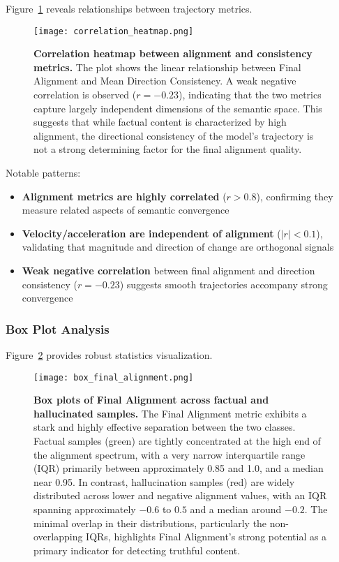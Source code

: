 \documentclass[11pt]{article}
\begin{document}
Figure~\ref{fig:correlation} reveals relationships between trajectory metrics.

\begin{figure}[h]
\centering
\texttt{[image: correlation\_heatmap.png]}
\caption{\textbf{Correlation heatmap between alignment and consistency metrics.}
The plot shows the linear relationship between Final Alignment and Mean Direction Consistency.
A weak negative correlation is observed ($r = -0.23$), indicating that the two metrics capture largely independent dimensions of the semantic space.
This suggests that while factual content is characterized by high alignment, the directional consistency of the model's trajectory is not a strong determining factor for the final alignment quality.}

\label{fig:correlation}
\end{figure}

Notable patterns:
\begin{itemize}[leftmargin=*]
    \item \textbf{Alignment metrics are highly correlated} ($r > 0.8$), confirming they measure related aspects of semantic convergence
    \item \textbf{Velocity/acceleration are independent of alignment} ($|r| < 0.1$), validating that magnitude and direction of change are orthogonal signals
    \item \textbf{Weak negative correlation} between final alignment and direction consistency ($r = -0.23$) suggests smooth trajectories accompany strong convergence
\end{itemize}

\subsubsection{Box Plot Analysis}

Figure~\ref{fig:boxplot_analysis} provides robust statistics visualization.

\begin{figure}[h]
\centering
\texttt{[image: box\_final\_alignment.png]}
\caption{\textbf{Box plots of Final Alignment across factual and hallucinated samples.}
The Final Alignment metric exhibits a stark and highly effective separation between the two classes.
Factual samples (green) are tightly concentrated at the high end of the alignment spectrum, with a very narrow interquartile range (IQR) primarily between approximately 0.85 and 1.0, and a median near 0.95.
In contrast, hallucination samples (red) are widely distributed across lower and negative alignment values, with an IQR spanning approximately $-0.6$ to $0.5$ and a median around $-0.2$.
The minimal overlap in their distributions, particularly the non-overlapping IQRs, highlights Final Alignment's strong potential as a primary indicator for detecting truthful content.}

\label{fig:boxplot_analysis}
\end{figure}
\end{document}
